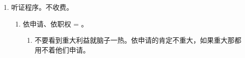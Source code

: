 \begin{enumerate}
\begin{enumerate}
                \begin{enumerate}
                  \item 书面申请。。
                        \begin{enumerate}
                          \item 格式文本。非必须、不收费。。例外。报名费。法律、行政法规规定。
                          \item {}。高度人身属性必须本人。。
                        \end{enumerate}
                  \item 受理。
                        \begin{enumerate}
                          \item 材料。\yi 有错当场改。\er 不合要求。当场补正告知书  日内一次告知。过程性行为不可诉。
                                。
                          \item {}。
                          \item 出具。
                        \end{enumerate}
                  \item 审查。实质审查。。
                  \item （书面）。
                        \begin{enumerate}
                          \item 准予 \yjt 颁发，；要。
                          \item 不予（包括事后撤销的） \yjt {}。
                        \end{enumerate}
                  \item 法律、行政法规、国务院设定的许可全国有效。例外。自我设限。。
                \end{enumerate}
          \item 听证程序。不收费。
                \begin{enumerate}
                  \item 依申请、依职权 = 。
                        \begin{enumerate}
                          \item \yi 不要看到重大利益就脑子一热。\er 依申请的肯定不重大，如果重大那都用不着他们申请。

\end{enumerate}
\end{enumerate}
\end{enumerate}
\end{enumerate}
